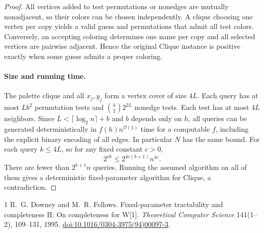 \documentclass[11pt]{article}
\begin{document}
\begin{proof}
All vertices added to test permutations or nonedges are mutually
nonadjacent, so their colors can be chosen independently.
A clique choosing one vertex per copy yields a valid guess and
permutations that admit all test colors. Conversely, an accepting
coloring determines one name per copy and all selected vertices are
pairwise adjacent. Hence the original Clique instance is positive
exactly when some guess admits a proper coloring.

\paragraph{Size and running time.}
The palette clique and all \(x_j,y_j\) form a vertex cover of size
\(4L\). Each query has at most \(Lb^2\) permutation tests and
\(\binom{h}{2}2^{2L}\) nonedge tests. Each test has at most \(4L\)
neighbors. Since \(L<\lceil\log_2 n\rceil+b\) and \(b\) depends
only on \(h\), all queries can be generated deterministically in
\(f(h)n^{\mathcal O(1)}\) time for a computable \(f\), including
the explicit binary encoding of all edges. In particular \(N\) has
the same bound. For each query \(k\le4L\), so for any fixed constant
\(c>0\),
\[
  2^{ck}\le 2^{4c(b+1)}n^{4c}.
\]
There are fewer than \(2^{b+1}n\) queries. Running the assumed
algorithm on all of them gives a deterministic fixed-parameter
algorithm for Clique, a contradiction.
\end{proof}

\begin{thebibliography}{1}
 R.~G. Downey and M.~R. Fellows.
Fixed-parameter tractability and completeness II: On completeness for W[1].
\emph{Theoretical Computer Science} 141(1--2), 109--131, 1995.
\href{https://doi.org/10.1016/0304-3975(94)00097-3}{doi:10.1016/0304-3975(94)00097-3}.
\end{thebibliography}
\end{document}
